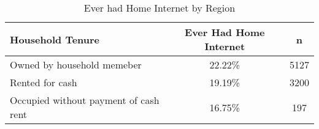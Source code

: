 \documentclass{article}
\begin{document}
\begin{table}[ht]
\centering
\begin{tabular}{lcc}
  \hline
  Household Tenure & Ever Had Home Internet & n \\ 
  \hline
  Owned by household memeber & 22.22\% & 5127 \\ 
  Rented for cash & 19.19\% & 3200 \\ 
  Occupied without payment of cash rent & 16.75\% & 197 \\ 
   \hline
\end{tabular}
\caption*{Ever had Home Internet by Region} 
\end{table}
\end{document}
